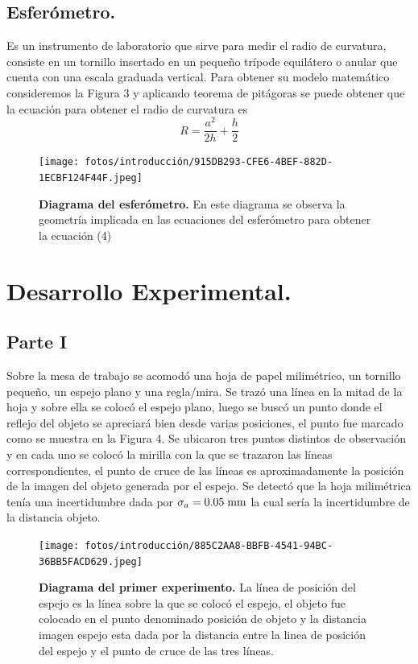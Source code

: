 \documentclass[DIV=calc, paper=a4, fontsize=11pt]{scrartcl}
\begin{document}
\subsection*{\textcolor{carmine}{Esferómetro.}}
Es un instrumento de laboratorio que sirve para medir el radio de curvatura, consiste en un tornillo insertado en un pequeño trípode equilátero o anular que cuenta con una escala graduada vertical. Para obtener su modelo matemático consideremos la Figura 3 y aplicando teorema de pitágoras se puede obtener que la ecuación para obtener el radio de curvatura es \cite{article}
\begin{equation}
    R= \frac{a^2}{2h}+\frac{h}{2}
\end{equation}
\begin{figure}[H]
    \centering
    \texttt{[image: fotos/introducción/915DB293-CFE6-4BEF-882D-1ECBF124F44F.jpeg]}
    \caption{\textbf{Diagrama del esferómetro.} En este diagrama se observa la geometría implicada en las ecuaciones del esferómetro para obtener la ecuación (4) \cite{article}}
    \label{fig:my_label}
\end{figure}
\section*{\textcolor{carmine}{Desarrollo Experimental.}}
\subsection*{\textcolor{carmine}{Parte I}}
 Sobre la mesa de trabajo se acomodó una hoja de papel milimétrico, un tornillo pequeño, un espejo plano y una regla/mira. Se trazó una línea en la mitad de la hoja y sobre ella se colocó el espejo plano, luego se buscó un punto donde el reflejo del objeto se apreciará bien desde varias posiciones, el punto fue marcado como se muestra en la Figura 4.  Se ubicaron tres puntos distintos de observación y en cada uno se colocó la mirilla con la que se trazaron las líneas correspondientes, el punto de cruce de las líneas es aproximadamente la posición de la imagen del objeto generada por el espejo. Se detectó que la hoja milimétrica tenía una incertidumbre dada por $\sigma_{a}=0.05\hspace{0.1cm}\text{mm}$ la cual sería la incertidumbre de la distancia objeto.
\begin{figure}[H]
    \centering
    \texttt{[image: fotos/introducción/885C2AA8-BBFB-4541-94BC-36BB5FACD629.jpeg]}
    \caption{\textbf{Diagrama del primer experimento.} La línea de posición del espejo es la línea sobre la que se colocó el espejo, el objeto fue colocado en el punto denominado posición de objeto y la distancia imagen espejo esta dada por la distancia entre la linea de posición del espejo y el punto de cruce de las tres líneas.}
    \label{fig:my_label}
\end{figure}
\end{document}
